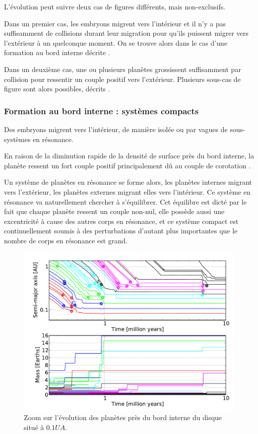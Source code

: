 L'évolution peut suivre deux cas de figures différents, mais non-exclusifs.

Dans un premier cas, les embryons migrent vers l'intérieur et il n'y a pas suffisamment de collisions durant leur migration pour qu'ils puissent migrer vers l'extérieur à un quelconque moment. On se trouve alors dans le cas d'une formation au bord interne décrite . 

Dans un deuxième cas, une ou plusieurs planètes grossissent suffisamment par collision pour ressentir un couple positif vers l'extérieur. Plusieurs sous-cas de figure sont alors possibles, décrits .

\subsubsection{Formation au bord interne : systèmes compacts}\label{sec:inner_edge_formation}
Des embryons migrent vers l'intérieur, de manière isolée ou par vagues de sous-systèmes en résonance.

En raison de la diminution rapide de la densité de surface près du bord interne, la planète ressent un fort couple positif principalement dû au couple de corotation . 

Un système de planètes en résonance se forme alors, les planètes internes migrant vers l'extérieur, les planètes externes migrant elles vers l'intérieur. Ce système en résonance va naturellement chercher à s'équilibrer. Cet équilibre est dicté par le fait que chaque planète ressent un couple non-nul, elle possède aussi une excentricité à cause des autres corps en résonance, et ce système compact est continuellement soumis à des perturbations d'autant plus importantes que le nombre de corps en résonance est grand. 

\begin{figure}[htbp]
\centering
\includegraphics[width=0.7\linewidth]{figure/HSE/inner_system.pdf}
\caption[Formation d'un système compact au bord interne.]{Zoom sur l'évolution des planètes près du bord interne du disque situé
à $0.1\unit{UA}$. }\label{fig:HSE_inner_system}
\end{figure}%

